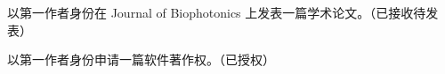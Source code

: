 \begin{resume}
  \thispagestyle{emptypage}

  \begin{enumerate}[label={[\arabic*]}]
  \addtolength{\itemsep}{0\baselineskip}%
  \item 以第一作者身份在 Journal of Biophotonics 上发表一篇学术论文。（已接收待发表）
    
  \item 以第一作者身份申请一篇软件著作权。（已授权）
\end{enumerate}
\end{resume}